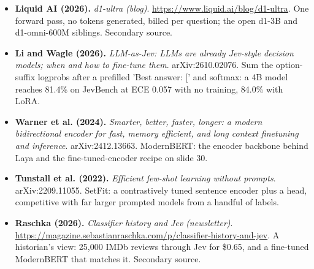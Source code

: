 \documentclass[11pt,letterpaper]{article}
\begin{document}
\begin{itemize}[leftmargin=1.2em,itemsep=3pt]
\item \textbf{Liquid AI (2026).} \textit{d1-ultra (blog)}. \url{https://www.liquid.ai/blog/d1-ultra}. One forward pass, no tokens generated, billed per question; the open d1-3B and d1-omni-600M siblings. Secondary source.
\item \textbf{Li and Wagle (2026).} \textit{LLM-as-Jev: LLMs are already Jev-style decision models; when and how to fine-tune them}. arXiv:2610.02076. Sum the option-suffix logprobs after a prefilled 'Best answer: [' and softmax: a 4B model reaches 81.4\% on JevBench at ECE 0.057 with no training, 84.0\% with LoRA.
\item \textbf{Warner et al. (2024).} \textit{Smarter, better, faster, longer: a modern bidirectional encoder for fast, memory efficient, and long context finetuning and inference}. arXiv:2412.13663. ModernBERT: the encoder backbone behind Laya and the fine-tuned-encoder recipe on slide 30.
\item \textbf{Tunstall et al. (2022).} \textit{Efficient few-shot learning without prompts}. arXiv:2209.11055. SetFit: a contrastively tuned sentence encoder plus a head, competitive with far larger prompted models from a handful of labels.
\item \textbf{Raschka (2026).} \textit{Classifier history and Jev (newsletter)}. \url{https://magazine.sebastianraschka.com/p/classifier-history-and-jev}. A historian's view: 25,000 IMDb reviews through Jev for \$0.65, and a fine-tuned ModernBERT that matches it. Secondary source.
\end{itemize}
\end{document}
